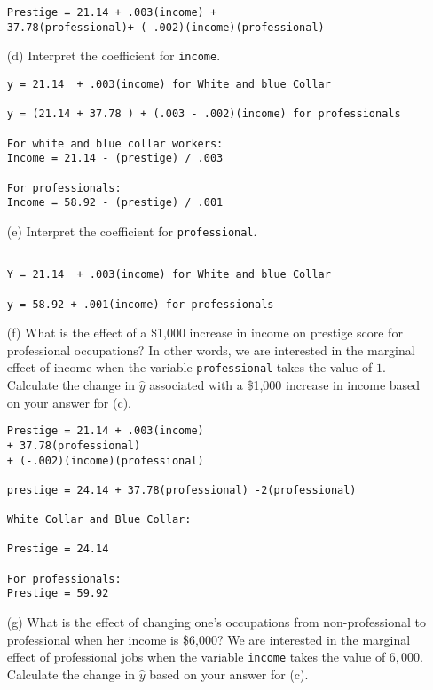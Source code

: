 \documentclass[12pt,letterpaper]{article}
\begin{document}
\begin{enumerate}
\begin{verbatim}
Prestige = 21.14 + .003(income) + 
37.78(professional)+ (-.002)(income)(professional)

\end{verbatim}
	
\item [(d)]
	Interpret the coefficient for \texttt{income}.
\begin{verbatim}
y = 21.14  + .003(income) for White and blue Collar
 
y = (21.14 + 37.78 ) + (.003 - .002)(income) for professionals

For white and blue collar workers:
Income = 21.14 - (prestige) / .003

For professionals:
Income = 58.92 - (prestige) / .001
\end{verbatim}
	\vspace{1cm}	
	\item [(e)]
	Interpret the coefficient for \texttt{professional}.
 \begin{verbatim}
 
Y = 21.14  + .003(income) for White and blue Collar

y = 58.92 + .001(income) for professionals
 \end{verbatim}
	
	\newpage
	\item [(f)]
	What is the effect of a \$1,000 increase in income on prestige score for professional occupations? In other words, we are interested in the marginal effect of income when the variable \texttt{professional} takes the value of $1$. Calculate the change in $\hat{y}$ associated with a \$1,000 increase in income based on your answer for (c).
	
	\vspace{1cm}
 \begin{verbatim}
Prestige = 21.14 + .003(income) 
+ 37.78(professional)
+ (-.002)(income)(professional)

prestige = 24.14 + 37.78(professional) -2(professional)

White Collar and Blue Collar:
  
Prestige = 24.14

For professionals:
Prestige = 59.92

 \end{verbatim}
	
	
	\item [(g)]
	What is the effect of changing one's occupations from non-professional to professional when her income is \$6,000? We are interested in the marginal effect of professional jobs when the variable \texttt{income} takes the value of $6,000$. Calculate the change in $\hat{y}$ based on your answer for (c).
	

\end{enumerate}
\end{document}
